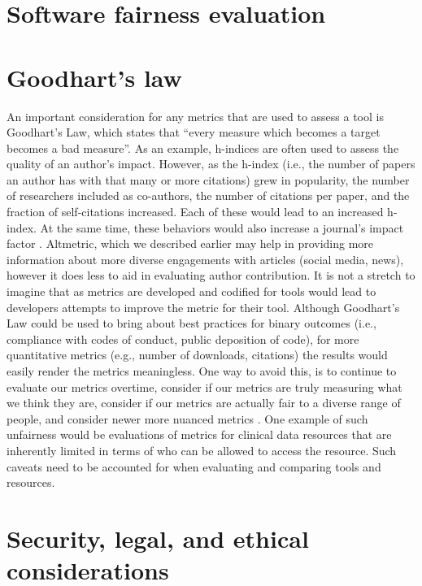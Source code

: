 \documentclass{article}
\begin{document}
\section{Software fairness evaluation}



\section{Goodhart’s law}
An important consideration for any metrics that are used to assess a tool is Goodhart’s Law, which states that “every measure which becomes a target becomes a bad measure\cite{hoskin_awful_1996}”. As an example, h-indices are often used to assess the quality of an author’s impact. However, as the h-index (i.e., the number of papers an author has with that many or more citations) grew in popularity, the number of researchers included as co-authors, the number of citations per paper, and the fraction of self-citations increased. Each of these would lead to an increased h-index. At the same time, these behaviors would also increase a journal’s impact factor \cite{fire_over-optimization_2019}. Altmetric, which we described earlier may help in providing more information about more diverse engagements with articles (social media, news), however it does less to aid in evaluating author contribution. It is not a stretch to imagine that as metrics are developed and codified for tools would lead to developers attempts to improve the metric for their tool. Although Goodhart’s Law could be used to bring about best practices for binary outcomes (i.e., compliance with codes of conduct, public deposition of code), for more quantitative metrics (e.g., number of downloads, citations) the results would easily render the metrics meaningless. One way to avoid this, is to continue to evaluate our metrics overtime, consider if our metrics are truly measuring what we think they are, consider if our metrics are actually fair to a diverse range of people, and consider newer more nuanced metrics \cite{fire_over-optimization_2019}. One example of such unfairness would be evaluations of metrics for clinical data resources that are inherently limited in terms of who can be allowed to access the resource. Such caveats need to be accounted for when evaluating and comparing tools and resources.

\section{Security, legal, and ethical considerations}
\end{document}
